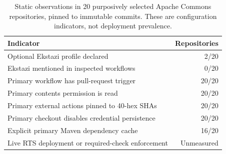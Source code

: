 \begin{table}[t]
\centering
\caption{Static observations in 20 purposively selected Apache Commons repositories, pinned to immutable commits. These are configuration indicators, not deployment prevalence.}
\label{tab:configuration-audit}
\begin{tabular}{lr}
\hline
Indicator & Repositories \\
\hline
Optional Ekstazi profile declared & 2/20 \\
Ekstazi mentioned in inspected workflows & 0/20 \\
Primary workflow has pull-request trigger & 20/20 \\
Primary contents permission is read & 20/20 \\
Primary external actions pinned to 40-hex SHAs & 20/20 \\
Primary checkout disables credential persistence & 20/20 \\
Explicit primary Maven dependency cache & 16/20 \\
Live RTS deployment or required-check enforcement & Unmeasured \\
\hline
\end{tabular}
\end{table}
